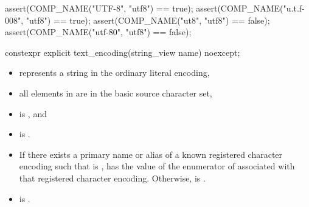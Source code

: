 \documentclass{wg21}
\begin{document}
\begin{addedblock}
\begin{example}
\begin{codeblock}
    assert(COMP_NAME("UTF-8", "utf8") == true);
    assert(COMP_NAME("u.t.f-008", "utf8") == true);
    assert(COMP_NAME("ut8", "utf8") == false);
    assert(COMP_NAME("utf-80", "utf8") == false);
\end{codeblock}
\end{example}



\begin{itemdecl}
constexpr explicit text_encoding(string_view name) noexcept;
\end{itemdecl}

\begin{itemdescr}
    \preconditions
    \begin{itemize}
        \item {} represents a string in the ordinary literal encoding,
        \item all elements in  are in the basic source character set,
        \item {} is , and
        \item {} is .
    \end{itemize}
    \postconditions
    \begin{itemize}
         \item If there exists a primary name or alias  of a known registered character encoding such that  is ,  has the value of the enumerator of  associated with that registered character encoding. Otherwise,  is .
         \item  {} is .
    \end{itemize}
\end{itemdescr}



\end{addedblock}
\end{document}
